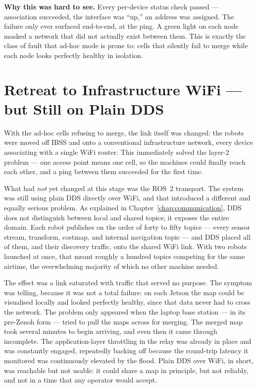 \begin{notebox}
\textbf{Why this was hard to see.} Every per-device status check passed --- association succeeded, the interface was ``up,'' an address was assigned. The failure only ever surfaced end-to-end, at the ping. A green light on each node masked a network that did not actually exist between them. This is exactly the class of fault that ad-hoc mode is prone to: cells that silently fail to merge while each node looks perfectly healthy in isolation.
\end{notebox}

\section{Retreat to Infrastructure WiFi --- but Still on Plain DDS}
\label{sec:plain_dds}

With the ad-hoc cells refusing to merge, the link itself was changed: the robots were moved off IBSS and onto a conventional infrastructure network, every device associating with a single WiFi router. This immediately solved the layer-2 problem --- one access point means one cell, so the machines could finally reach each other, and a ping between them succeeded for the first time.

What had \emph{not} yet changed at this stage was the ROS~2 transport. The system was still using plain DDS directly over WiFi, and that introduced a different and equally serious problem. As explained in Chapter~\ref{chap:communication}, DDS does not distinguish between local and shared topics; it exposes the entire domain. Each robot publishes on the order of forty to fifty topics --- every sensor stream, transform, costmap, and internal navigation topic --- and DDS placed all of them, and their discovery traffic, onto the shared WiFi link. With two robots launched at once, that meant roughly a hundred topics competing for the same airtime, the overwhelming majority of which no other machine needed.

The effect was a link saturated with traffic that served no purpose. The symptom was telling, because it was not a total failure: on each Jetson the map could be visualised locally and looked perfectly healthy, since that data never had to cross the network. The problem only appeared when the laptop base station --- in its pre-Zenoh form --- tried to pull the maps across for merging. The merged map took several minutes to begin arriving, and even then it came through incomplete. The application-layer throttling in the relay was already in place and was constantly engaged, repeatedly backing off because the round-trip latency it monitored was continuously elevated by the flood. Plain DDS over WiFi, in short, was reachable but not usable: it could share a map in principle, but not reliably, and not in a time that any operator would accept.

